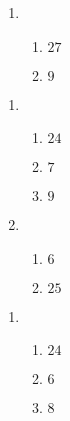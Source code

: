 \documentclass[12pt,twoside]{article}
\makeatletter
\def\emptycleardoublepage{\clearpage\if@twoside \ifodd\c@page\else
\thispagestyle{empty}%
\hbox{}\newpage\if@twocolumn\hbox{}\newpage\fi\fi\fi}
\makeatother
\begin{document}
\begin{multicols}{2}
\begin{enumerate}
\item \begin{enumerate}
\def \a{9}\def \b{18}\def \apb{27}
\item $\apb$
\def \a{2}\def \b{7}\def \ab{9}
\item $\ab$
\def \vshift{-5}\def \hshift{-4}\def \chang{-1}\def \findval{-5}\def \yval{-3}
\end{enumerate}
\end{enumerate}\end{multicols}\emptycleardoublepage{}\graphicspath{{/Users/jilan/Downloads/Randomizer/Randomizer/Sample Course/Sample Assessment 2/}}\begin{multicols}{2} \begin{enumerate}
\item \begin{enumerate}
\def \a{6}\def \b{18}\def \apb{24}
\item $\apb$
\def \a{14}\def \dif{7}\def \b{7}
\item $\dif$
\def \a{3}\def \b{6}\def \ab{9}
\item $\ab$
\def \vshift{3}\def \hshift{2}\def \chang{-1}\def \findval{1}\def \yval{5}
\end{enumerate}

\item \begin{enumerate}
\def \a{12}\def \dif{6}\def \b{6}
\item $\dif$
\def \a{7}\def \b{18}\def \apb{25}
\item $\apb$
\def \vshift{-3}\def \hshift{2}\def \chang{-2}\def \findval{0}\def \yval{1}
\end{enumerate}
\end{enumerate}\end{multicols}\emptycleardoublepage{}\graphicspath{{/Users/jilan/Downloads/Randomizer/Randomizer/Sample Course/Sample Assessment 2/}}\begin{multicols}{2} \begin{enumerate}
\item \begin{enumerate}
\def \a{7}\def \b{17}\def \apb{24}
\item $\apb$
\def \a{12}\def \dif{6}\def \b{6}
\item $\dif$
\def \a{2}\def \b{6}\def \ab{8}
\item $\ab$
\def \vshift{-3}\def \hshift{-4}\def \chang{0}\def \findval{-4}\def \yval{-3}
\end{enumerate}


\end{enumerate}
\end{multicols}
\end{document}
